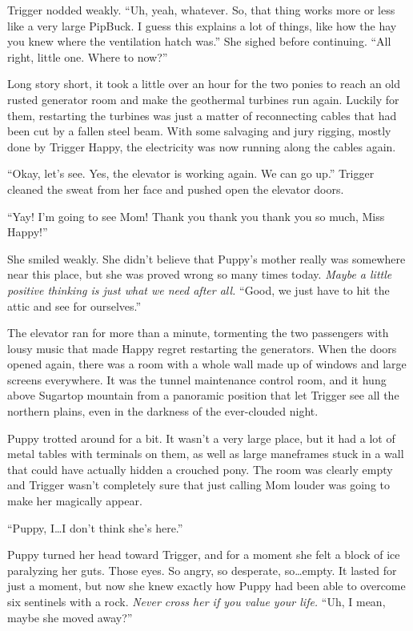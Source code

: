 Trigger nodded weakly. ``Uh, yeah, whatever. So, that thing works more or less like a very large PipBuck. I guess this explains a lot of things, like how the hay you knew where the ventilation hatch was.'' She sighed before continuing. ``All right, little one. Where to now?''


\horizonline


Long story short, it took a little over an hour for the two ponies to reach an old rusted generator room and make the geothermal turbines run again. Luckily for them, restarting the turbines was just a matter of reconnecting cables that had been cut by a fallen steel beam. With some salvaging and jury rigging, mostly done by Trigger Happy, the electricity was now running along the cables again.

``Okay, let's see. Yes, the elevator is working again. We can go up.'' Trigger cleaned the sweat from her face and pushed open the elevator doors.

``Yay! I'm going to see Mom! Thank you thank you thank you so much, Miss Happy!''

She smiled weakly. She didn't believe that Puppy's mother really was somewhere near this place, but she was proved wrong so many times today. \emph{Maybe a little positive thinking is just what we need after all.}\/ ``Good, we just have to hit the attic and see for ourselves.''

The elevator ran for more than a minute, tormenting the two passengers with lousy music that made Happy regret restarting the generators. When the doors opened again, there was a room with a whole wall made up of windows and large screens everywhere. It was the tunnel maintenance control room, and it hung above Sugartop mountain from a panoramic position that let Trigger see all the northern plains, even in the darkness of the ever-clouded night.

Puppy trotted around for a bit. It wasn't a very large place, but it had a lot of metal tables with terminals on them, as well as large maneframes stuck in a wall that could have actually hidden a crouched pony. The room was clearly empty and Trigger wasn't completely sure that just calling Mom louder was going to make her magically appear.

``Puppy, I\dots I don't think she's here.''

Puppy turned her head toward Trigger, and for a moment she felt a block of ice paralyzing her guts. Those eyes. So angry, so desperate, so\dots empty. It lasted for just a moment, but now she knew exactly how Puppy had been able to overcome six sentinels with a rock. \emph{Never cross her if you value your life.}\/ ``Uh, I mean, maybe she moved away?''

